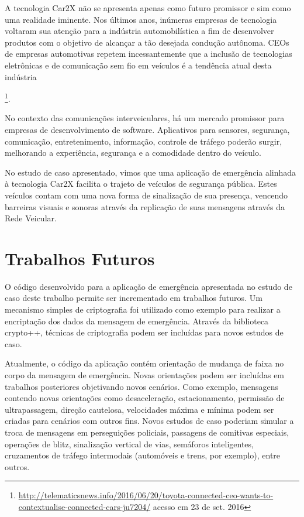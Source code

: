 \documentclass[
12pt,				%
openright,			%
oneside,			%
a4paper,			%
brazil,				%
]{abntex2}
\begin{document}
	\par A tecnologia Car2X não se apresenta apenas como futuro promissor e sim como uma realidade iminente. Nos últimos anos, inúmeras empresas de tecnologia voltaram sua atenção para a indústria automobilística a fim de desenvolver produtos com o objetivo de alcançar a tão desejada condução autônoma. CEOs de empresas automotivas repetem incessantemente que a inclusão de tecnologias eletrônicas e de comunicação sem fio em veículos é a tendência atual desta indústria{\footnote{\href{http://telematicsnews.info/2016/06/20/toyota-connected-ceo-wants-to-contextualise-connected-cars-ju7204/}{http://telematicsnews.info/2016/06/20/toyota-connected-ceo-wants-to-contextualise-connected-cars-ju7204/} acesso em 23 de set. 2016}.

	\par No contexto das comunicações interveiculares, há um mercado promissor para empresas de desenvolvimento de software. Aplicativos para sensores, segurança, comunicação, entretenimento, informação, controle de tráfego poderão surgir, melhorando a experiência, segurança e a comodidade dentro do veículo.

	\par No estudo de caso apresentado, vimos que uma aplicação de emergência alinhada à tecnologia Car2X facilita o trajeto de veículos de segurança pública. Estes veículos contam com uma nova forma de sinalização de sua presença, vencendo barreiras visuais e sonoras através da replicação de suas mensagens através da Rede Veicular.


	\chapter*[Trabalhos Futuros]{Trabalhos Futuros}

	\par O código desenvolvido para a aplicação de emergência apresentada no estudo de caso deste trabalho permite ser incrementado em trabalhos futuros. Um mecanismo simples de criptografia foi utilizado como exemplo para realizar a encriptação dos dados da mensagem de emergência. Através da biblioteca crypto++, técnicas de criptografia podem ser incluídas para novos estudos de caso.

	\par Atualmente, o código da aplicação contém orientação de mudança de faixa no corpo da mensagem de emergência. Novas orientações podem ser incluídas em trabalhos posteriores objetivando novos cenários. Como exemplo, mensagens contendo novas orientações como desaceleração, estacionamento, permissão de ultrapassagem, direção cautelosa, velocidades máxima e mínima podem ser criadas para cenários com outros fins. Novos estudos de caso poderiam simular a troca de mensagens em perseguições policiais, passagens de comitivas especiais, operações de blitz, sinalização vertical de vias, semáforos inteligentes, cruzamentos de tráfego intermodais (automóveis e trens, por exemplo), entre outros.

}
\end{document}
